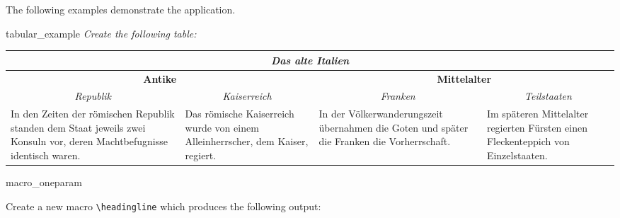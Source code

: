 
\clearpage
The following examples demonstrate the application.

\begin{dispListing}
\tcbstartrecording
\end{dispListing}
\tcbusetemp


\begin{dispExample}
\begin{texercise}{tabular_example}
\textit{Create the following table:}\par\smallskip%
\begin{tcboutputlisting}
\begin{tabular}{|p{3cm}|p{3cm}|p{3cm}|p{3cm}|}\hline
\multicolumn{4}{|c|}{\bfseries\itshape Das alte Italien}\\\hline
\multicolumn{2}{|c|}{\bfseries Antike} &
\multicolumn{2}{c|}{\bfseries Mittelalter}\\\hline
\multicolumn{1}{|c|}{\itshape Republik}&
\multicolumn{1}{c|}{\itshape Kaiserreich}&
\multicolumn{1}{c|}{\itshape Franken}&
\multicolumn{1}{c|}{\itshape Teilstaaten}\\\hline
In den Zeiten der r\"{o}mischen Republik standen dem Staat jeweils zwei
Konsuln vor, deren Machtbefugnisse identisch waren. &
Das r\"{o}mische Kaiserreich wurde von einem Alleinherrscher, dem Kaiser,
regiert.
& In der V\"{o}lkerwanderungszeit \"{u}bernahmen die Goten und sp\"{a}ter die
Franken die Vorherrschaft.
& Im sp\"{a}teren Mittelalter regierten F\"{u}rsten einen Fleckenteppich
von Einzelstaaten.\\\hline
\end{tabular}
\end{tcboutputlisting}
\tcbuselistingtext%
\end{texercise}
\end{dispExample}


\begin{dispExample}
\begin{texercise}{macro_oneparam}
\begin{tcboutputlisting}
\newcommand{\headingline}[1]{%
  \begin{center}\Large\bfseries #1\end{center}}
\end{tcboutputlisting}
\tcbuselistingtext%

Create a new macro \verb+\headingline+ which produces the
following output:\par\smallskip
\begin{tcbwritetemp}
\end{tcbwritetemp}
\tcbusetemplisting\tcbusetemp%
\end{texercise}
\end{dispExample}




